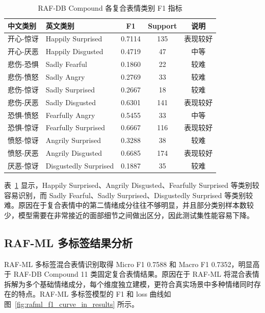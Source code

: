 \documentclass[UTF8,a4paper,12pt]{ctexart}
\begin{document}
\begin{table}[H]
  \centering
  \caption{RAF-DB Compound 各复合表情类别 F1 指标}
  \label{tab:compound_per_class_f1}
  \small
  \setlength{\tabcolsep}{5pt}
  \renewcommand{\arraystretch}{1.12}
  \begin{tabularx}{\textwidth}{p{}p{}ccc}
    \toprule
    中文类别 & 英文类别 & F1 & Support & 说明 \\
    \midrule
    开心-惊讶 & Happily Surprised & 0.7114 & 135 & 表现较好 \\
    开心-厌恶 & Happily Disgusted & 0.4719 & 47 & 中等 \\
    悲伤-恐惧 & Sadly Fearful & 0.1860 & 22 & 较难 \\
    悲伤-愤怒 & Sadly Angry & 0.2769 & 33 & 较难 \\
    悲伤-惊讶 & Sadly Surprised & 0.2667 & 18 & 较难 \\
    悲伤-厌恶 & Sadly Disgusted & 0.6301 & 141 & 表现较好 \\
    恐惧-愤怒 & Fearfully Angry & 0.5455 & 33 & 中等 \\
    恐惧-惊讶 & Fearfully Surprised & 0.6667 & 116 & 表现较好 \\
    愤怒-惊讶 & Angrily Surprised & 0.3288 & 38 & 较难 \\
    愤怒-厌恶 & Angrily Disgusted & 0.6685 & 174 & 表现较好 \\
    厌恶-惊讶 & Disgustedly Surprised & 0.1887 & 35 & 较难 \\
    \bottomrule
  \end{tabularx}
\end{table}

表~\ref{tab:compound_per_class_f1} 显示，Happily Surprised、Angrily Disgusted、Fearfully Surprised 等类别较容易识别，而 Sadly Fearful、Sadly Surprised、Disgustedly Surprised 等类别较难。原因在于复合表情中的第二情绪成分往往不够明显，并且部分类别样本数较少，模型需要在非常接近的面部细节之间做出区分，因此测试集性能容易下降。

\subsection{RAF-ML 多标签结果分析}

RAF-ML 多标签混合表情识别取得 Micro F1 0.7588 和 Macro F1 0.7352，明显高于 RAF-DB Compound 11 类固定复合表情结果。原因在于 RAF-ML 将混合表情拆解为多个基础情绪成分，每个维度独立建模，更符合真实场景中多种情绪同时存在的特点。RAF-ML 多标签模型的 F1 和 loss 曲线如图~\ref{fig:rafml_f1_curve_in_results} 所示。
\end{document}

